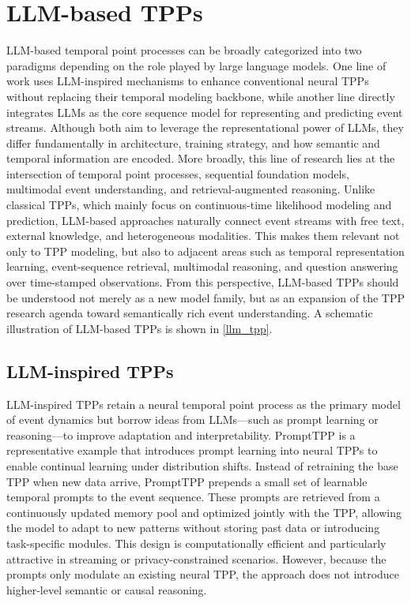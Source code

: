 \documentclass[10pt]{article} %
\begin{document}
\section{LLM-based TPPs}
LLM-based temporal point processes can be broadly categorized into two paradigms depending on the role played by large language models. One line of work uses LLM-inspired mechanisms to enhance conventional neural TPPs without replacing their temporal modeling backbone, while another line directly integrates LLMs as the core sequence model for representing and predicting event streams. Although both aim to leverage the representational power of LLMs, they differ fundamentally in architecture, training strategy, and how semantic and temporal information are encoded.
More broadly, this line of research lies at the intersection of temporal point processes, sequential foundation models, multimodal event understanding, and retrieval-augmented reasoning. Unlike classical TPPs, which mainly focus on continuous-time likelihood modeling and prediction, LLM-based approaches naturally connect event streams with free text, external knowledge, and heterogeneous modalities. This makes them relevant not only to TPP modeling, but also to adjacent areas such as temporal representation learning, event-sequence retrieval, multimodal reasoning, and question answering over time-stamped observations. From this perspective, LLM-based TPPs should be understood not merely as a new model family, but as an expansion of the TPP research agenda toward semantically rich event understanding.
A schematic illustration of LLM-based TPPs is shown in \cref{llm_tpp}.

\subsection{LLM-inspired TPPs}

\label{llm_inspired}

LLM-inspired TPPs retain a neural temporal point process as the primary model of event dynamics but borrow ideas from LLMs—such as prompt learning or reasoning—to improve adaptation and interpretability. PromptTPP \citep{xue2023prompt} is a representative example that introduces prompt learning into neural TPPs to enable continual learning under distribution shifts. Instead of retraining the base TPP when new data arrive, PromptTPP prepends a small set of learnable temporal prompts to the event sequence. These prompts are retrieved from a continuously updated memory pool and optimized jointly with the TPP, allowing the model to adapt to new patterns without storing past data or introducing task-specific modules. This design is computationally efficient and particularly attractive in streaming or privacy-constrained scenarios. However, because the prompts only modulate an existing neural TPP, the approach does not introduce higher-level semantic or causal reasoning.
\end{document}
